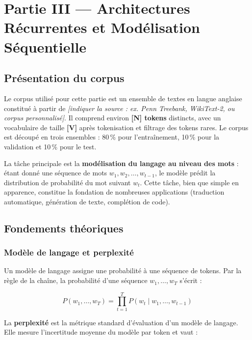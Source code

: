\documentclass[11pt,a4paper]{article}
\begin{document}
\section{Partie III — Architectures Récurrentes et Modélisation Séquentielle}

\subsection{Présentation du corpus}

Le corpus utilisé pour cette partie est un ensemble de textes en langue anglaise
constitué à partir de \textit{[indiquer la source : ex. Penn Treebank, WikiText-2,
ou corpus personnalisé]}. Il comprend environ \textbf{[N] tokens} distincts, avec
un vocabulaire de taille \textbf{[V]} après tokenisation et filtrage des tokens rares.
Le corpus est découpé en trois ensembles : 80\,\% pour l'entraînement, 10\,\% pour
la validation et 10\,\% pour le test.

La tâche principale est la \textbf{modélisation du langage au niveau des mots} :
étant donné une séquence de mots $w_1, w_2, \ldots, w_{t-1}$, le modèle prédit
la distribution de probabilité du mot suivant $w_t$. Cette tâche, bien que simple
en apparence, constitue la fondation de nombreuses applications (traduction automatique,
génération de texte, complétion de code).

\subsection{Fondements théoriques}

\subsubsection{Modèle de langage et perplexité}

Un modèle de langage assigne une probabilité à une séquence de tokens. Par la règle de
la chaîne, la probabilité d'une séquence $w_1, \ldots, w_T$ s'écrit :

\begin{equation}
  P(w_1, \ldots, w_T) = \prod_{t=1}^{T} P(w_t \mid w_1, \ldots, w_{t-1})
  \label{eq:lm_chain}
\end{equation}

La \textbf{perplexité} est la métrique standard d'évaluation d'un modèle de langage.
Elle mesure l'incertitude moyenne du modèle par token et vaut :
\end{document}
